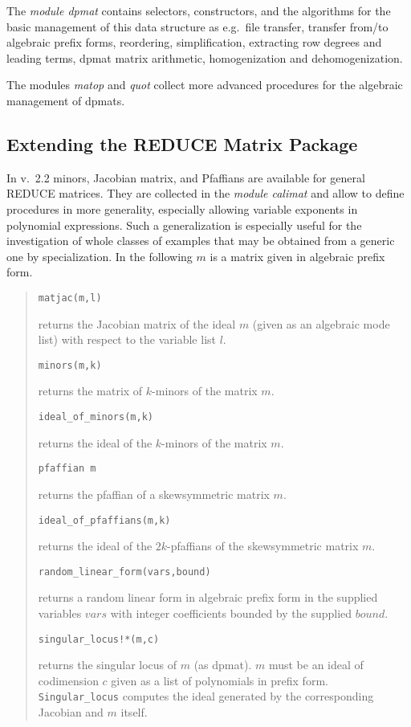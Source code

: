 \documentclass[a4paper,11pt]{article}
\newcommand{\ind}[1]{{\em #1}\index{#1}}
\newcommand{\pbx}[1]{\mbox{}\hfill \parbox[t]{12cm}{#1} \pagebreak[3]}
\begin{document}
The \ind{module dpmat} contains selectors, constructors, and the
algorithms for the basic management of this data structure as e.g.\
file transfer, transfer from/to algebraic prefix forms, reordering,
simplification, extracting row degrees and leading terms, dpmat matrix
arithmetic, homogenization and dehomogenization. 

The modules {\em matop} and {\em quot} collect more advanced procedures 
for the algebraic management of dpmats.

\subsection{Extending the REDUCE Matrix Package}

In v.\ 2.2 minors, Jacobian matrix, and Pfaffians are available for
general REDUCE matrices. They are collected in the \ind{module
calimat} and allow to define procedures in more generality, especially
allowing variable exponents in polynomial expressions. Such a
generalization is especially useful for the investigation of whole
classes of examples that may be obtained from a generic one by
specialization. In the following $m$ is a matrix given in algebraic
prefix form. 
\begin{quote}
\verb|matjac(m,l)| 

\pbx{returns the Jacobian matrix of the ideal $m$ (given as an
algebraic mode list) with respect to the variable list $l$.} 

\verb|minors(m,k)| 

\pbx{returns the matrix of $k$-minors of the matrix $m$.}

\verb|ideal_of_minors(m,k)| 

\pbx{returns the ideal of the $k$-minors of the matrix $m$.}

\verb|pfaffian m| 

\pbx{returns the pfaffian of a skewsymmetric matrix $m$.}

\verb|ideal_of_pfaffians(m,k)| 

\pbx{returns the ideal of the $2k$-pfaffians of the skewsymmetric
matrix $m$.} 

\verb|random_linear_form(vars,bound)| 

\pbx{returns a random linear form in algebraic prefix form in the
supplied variables $vars$ with integer coefficients bounded by the
supplied $bound$.}  

\verb|singular_locus!*(m,c)| 

\pbx{returns the singular locus of $m$ (as dpmat). $m$ must be an
ideal of codimension $c$ given as a list of polynomials in prefix
form. {\tt Singular\_locus} computes the ideal generated by the
corresponding Jacobian and $m$ itself.}    
\end{quote}
\end{document}

